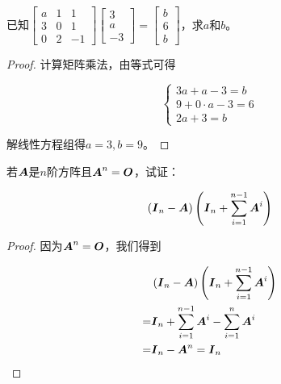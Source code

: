 \begin{problem}
已知\(\begin{bmatrix}a&1&1\\3&0&1\\0&2&-1\end{bmatrix}\begin{bmatrix}3\\a\\-3\end{bmatrix}=\begin{bmatrix}b\\6\\b\end{bmatrix}\)，求\(a\)和\(b\)。
\end{problem}
\begin{proof}
    计算矩阵乘法，由等式可得

    \begin{equation*}
        \begin{cases}
            3a+a-3=b       \\
            9+0\cdot a-3=6 \\
            2a+3=b
        \end{cases}
    \end{equation*}

    解线性方程组得\(a=3,b=9\)。
\end{proof}

\begin{problem}
若\(\boldsymbol{A}\)是\(n\)阶方阵且\(\boldsymbol{A}^n=\boldsymbol{O}\)，试证：

\begin{equation*}
    \left( \boldsymbol{I}_n-\boldsymbol{A} \right)\left( \boldsymbol{I}_n+\sum_{i=1}^{n-1}\boldsymbol{A}^i \right)
\end{equation*}
\end{problem}
\begin{proof}
    因为\(\boldsymbol{A}^n=\boldsymbol{O}\)，我们得到

    \begin{align*}
          & \left( \boldsymbol{I}_n-\boldsymbol{A} \right)\left( \boldsymbol{I}_n+\sum_{i=1}^{n-1}\boldsymbol{A}^i \right) \\
        = & \boldsymbol{I}_n+\sum_{i=1}^{n-1}\boldsymbol{A}^i-\sum_{i=1}^n\boldsymbol{A}^i          \\
        = & \boldsymbol{I}_n-\boldsymbol{A}^n=\boldsymbol{I}_n
    \end{align*}
\end{proof}

